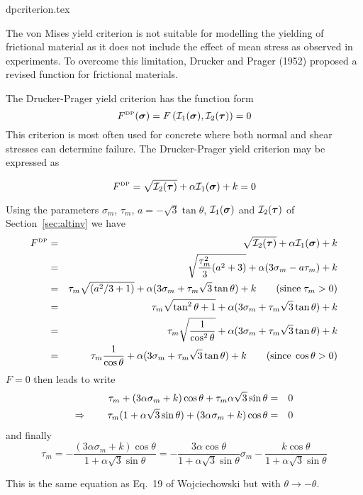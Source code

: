 \begin{flushright} {\tiny {\color{gray} dpcriterion.tex}} \end{flushright}

The von Mises yield criterion is not suitable for modelling the yielding of frictional material 
as it does not include the effect of mean stress as observed in experiments. To overcome this 
limitation, Drucker and Prager (1952) \cite{drpr52} proposed a revised function for frictional materials.

The Drucker-Prager yield criterion has the function form
\begin{equation}
F^{\text{\tiny DP}}({\bm \sigma})=F \left( {\cal I}_1({\bm \sigma}), {\cal I}_2({\bm \tau}) \right) = 0 
\end{equation}
This criterion is most often used for concrete where both normal and shear stresses 
can determine failure. The Drucker-Prager yield criterion may be expressed as
\begin{mdframed}[backgroundcolor=blue!5]
\begin{equation}
F^{\text{\tiny DP}}= \sqrt{{\cal I}_2({\bm \tau})} + \alpha {\cal I}_1({\bm \sigma}) + k =0  
\label{dpcriterion} 
\end{equation}
\end{mdframed}
Using the parameters $\sigma_m$, $\tau_m$, $a=-\sqrt{3}\tan\theta$, ${\cal I}_1({\bm \sigma})$ 
and ${\cal I}_2({\bm \tau})$ of Section~\ref{sec:altinv} we have
\begin{eqnarray}
F^{\text{\tiny DP}}
&=&  \sqrt{{\cal I}_2({\bm \tau})} + \alpha {\cal I}_1({\bm \sigma}) + k \nonumber\\
&=& \sqrt{\frac{\tau_m^2}{3}(a^2+3)} + \alpha (3\sigma_m-a\tau_m) + k \nonumber\\ 
&=& \tau_m \sqrt{(a^2/3+1)} + \alpha (3\sigma_m+\tau_m\sqrt{3}\tan\theta ) + k    \qquad ({\rm since }\; \tau_m>0)\nonumber\\ 
&=& \tau_m \sqrt{\tan^2\theta+1} + \alpha (3\sigma_m+\tau_m\sqrt{3}\tan\theta ) + k  \nonumber\\
&=& \tau_m \sqrt{ \frac{1}{\cos^2\theta} } + \alpha (3\sigma_m+\tau_m\sqrt{3}\tan\theta ) + k  \nonumber\\
&=& \tau_m \frac{1}{\cos\theta} +\alpha (3\sigma_m+\tau_m\sqrt{3}\tan\theta ) + k  \qquad ({\rm since }\; \cos\theta >0)\nonumber
\end{eqnarray}
$F=0$ then leads to write
\begin{eqnarray}
\tau_m  + (3 \alpha \sigma_m+k)\cos\theta  + \tau_m \alpha \sqrt{3}\sin\theta  &=&0 \nonumber\\
\Rightarrow \qquad \tau_m(1 + \alpha \sqrt{3}\sin\theta)  + (3 \alpha \sigma_m+k)\cos\theta &=&0 \nonumber
\end{eqnarray}
and finally
\[
\tau_m = -\frac{(3 \alpha \sigma_m+k)\cos\theta}{1 + \alpha \sqrt{3}\sin\theta}
= -\frac{3 \alpha \cos\theta}{1 + \alpha \sqrt{3}\sin\theta} \sigma_m 
-\frac{k\cos\theta}{1 + \alpha \sqrt{3}\sin\theta}
\]
\begin{remark}
This is the same equation as Eq.~19 of Wojciechowski \cite{wojc18} but with $\theta \rightarrow -\theta$. 
\end{remark}

